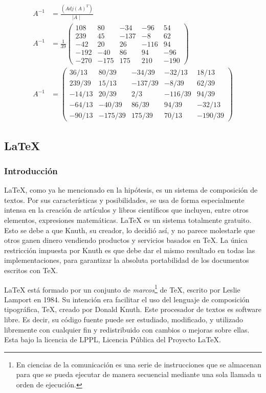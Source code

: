 \documentclass{article}
\begin{document}
\begin{enumerate}
\begin{equation*}
\begin{split}
    A^{-1} &= \frac{(Adj(A)^{T})}{\mid A \mid}\\
    A^{-1} &=\frac{1}{39}\left(
    \begin{array}{ccccc}
    108 & 80 & -34 & -96 & 54  \\
    239 & 45 & -137 & -8 & 62\\
    -42 & 20 &  26 &  -116 & 94\\
    -192 & -40 &86 & 94 & -96 \\
    -270 & -175 & 175 & 210 & -190
    \end{array}  \right)\\
   A^{-1} &=\left(
    \begin{array}{ccccc}
    36/13 & 80/39 & -34/39 & -32/13 & 18/13  \\
    239/39 & 15/13 & -137/39 & -8/39 & 62/39\\
    -14/13 & 20/39 &  2/3 &  -116/39 & 94/39\\
    -64/13 & -40/39 & 86/39 & 94/39 & -32/13 \\
    -90/13 & -175/39 & 175/39 & 70/13 & -190/39
    \end{array}  \right)
\end{split}
\end{equation*}
\end{enumerate}

\newpage
\subsection{\LaTeX}
\subsubsection{Introducción}
\LaTeX, como ya he mencionado en la hipótesis, es un sistema de composición de textos. Por sus características y posibilidades, se usa de forma especialmente intensa en la creación de artículos y libros científicos que incluyen, entre otros elementos, expresiones matemáticas. \LaTeX \; es un sistema totalmente gratuito. Esto se debe a que Knuth, su creador, lo decidió así, y no parece molestarle que otros ganen dinero vendiendo productos y servicios basados en TeX. La única restricción impuesta por Knuth es que debe dar el mismo resultado en todas las implementaciones, para garantizar la absoluta portabilidad de los documentos escritos con TeX.

\LaTeX \; está formado por un conjunto de \textit{marcos}\footnote{En ciencias de la comunicación es una serie de instrucciones que se almacenan para que se pueda ejecutar de manera secuencial mediante una sola llamada u orden de ejecución.} de TeX, escrito por Leslie Lamport en 1984. Su intención era facilitar el uso del lenguaje de composición tipográfica, TeX, creado por Donald Knuth. Este procesador de textos es software libre. Es decir, su código fuente puede ser estudiado, modificado, y utilizado libremente con cualquier fin y redistribuido  con cambios o mejoras sobre ellas. Esta bajo la licencia de LPPL, Licencia Pública del Proyecto LaTeX.
\end{document}
